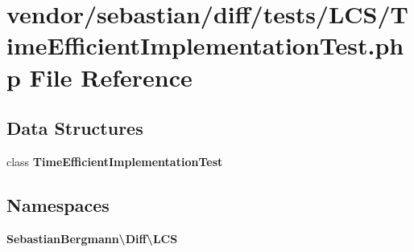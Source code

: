 \section{vendor/sebastian/diff/tests/\+L\+C\+S/\+Time\+Efficient\+Implementation\+Test.php File Reference}
\label{_time_efficient_implementation_test_8php}
\subsection*{Data Structures}
\begin{DoxyCompactItemize}
\item 
class {\bf Time\+Efficient\+Implementation\+Test}
\end{DoxyCompactItemize}
\subsection*{Namespaces}
\begin{DoxyCompactItemize}
\item 
 {\bf Sebastian\+Bergmann\textbackslash{}\+Diff\textbackslash{}\+L\+C\+S}
\end{DoxyCompactItemize}

